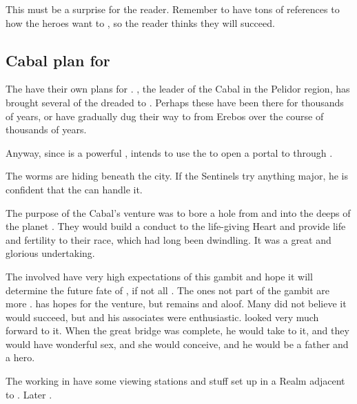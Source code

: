This must be a surprise for the reader. 
Remember to have tons of references to how the heroes want to , so the reader thinks they will succeed. 










\subsection[Cabal plan for Malcur]{Cabal plan for \Malcur}
The  have their own plans for \Malcur. 
, the leader of the Cabal in the Pelidor region, has brought several of the dreaded  to \Malcur. Perhaps these \noggyaleth{} have been there for thousands of years, or have gradually dug their way to \Malcur from Erebos over the course of thousands of years. 

Anyway, since \Malcur is a powerful \nexus, \Teshrial{} intends to use the \noggyaleth{} to open a portal to  through \Malcur. 

The worms are hiding beneath the city. 
If the Sentinels try anything major, he is confident that the \noggyaleth{} can handle it. 

The purpose of the Cabal's \Malcur venture was to bore a hole from \Nyx and into the deeps of the planet \Miith.
They would build a conduct to the life-giving Heart and provide life and fertility to their race, which had long been dwindling.
It was a great and glorious undertaking.

The \resphain involved have very high expectations of this gambit and hope it will determine the future fate of \CiriathSepher, if not all \resphain. 
The ones not part of the gambit are more \skeptical. 
\Azraid has hopes for the venture, but remains \skeptical and aloof.
Many did not believe it would succeed, but \Teshrial and his associates were enthusiastic.
\Teshrial looked very much forward to it.
When the great bridge was complete, he would take \Firaxel to it, and they would have wonderful sex, and she would conceive, and he would be a father and a hero.

The \resphain working in \Malcur have some viewing stations and stuff set up in a Realm adjacent to \Azmith. 
Later . 

